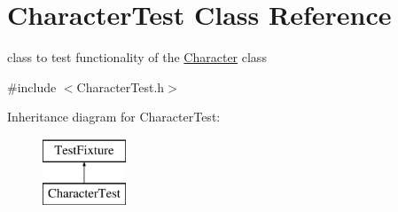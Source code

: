 \hypertarget{classCharacterTest}{\section{Character\-Test Class Reference}
\label{classCharacterTest}
}


class to test functionality of the \hyperlink{classCharacter}{Character} class  




{\ttfamily \#include $<$Character\-Test.\-h$>$}

Inheritance diagram for Character\-Test\-:\begin{figure}[H]
\begin{center}
\leavevmode
\includegraphics[height=2.000000cm]{classCharacterTest}
\end{center}
\end{figure}
